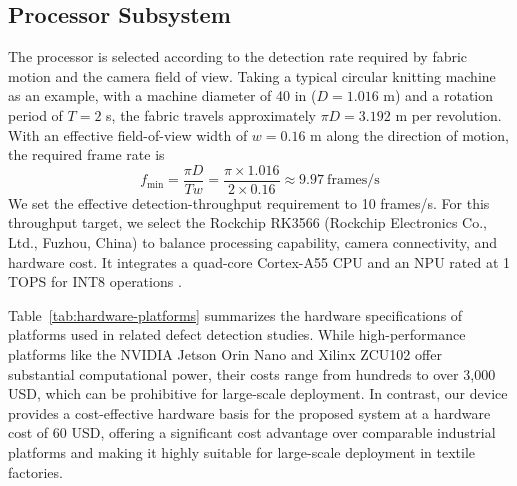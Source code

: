 \documentclass[journal]{IEEEtranTIE}
\begin{document}
\subsection{Processor Subsystem}
\label{sec:coverage}
The processor is selected according to the detection rate required by fabric motion and the camera field of view. Taking a typical circular knitting machine as an example, with a machine diameter of 40 in ($D=1.016$ m) and a rotation period of $T=2$ s, the fabric travels approximately $\pi D=3.192$ m per revolution. With an effective field-of-view width of $w=0.16$ m along the direction of motion, the required frame rate is
\begin{equation}
f_{\min}=\frac{\pi D}{Tw}
=\frac{\pi\times1.016}{2\times0.16}
\approx9.97\ \mathrm{frames/s}
\label{eq:coverage-rate}
\end{equation}
\noindent We set the effective detection-throughput requirement to 10 frames/s. For this throughput target, we select the Rockchip RK3566 (Rockchip Electronics Co., Ltd., Fuzhou, China) to balance processing capability, camera connectivity, and hardware cost. It integrates a quad-core Cortex-A55 CPU and an NPU rated at 1 TOPS for INT8 operations \cite{rockchiprk3566}.

Table~\ref{tab:hardware-platforms} summarizes the hardware specifications of platforms used in related defect detection studies. While high-performance platforms like the NVIDIA Jetson Orin Nano and Xilinx ZCU102 offer substantial computational power, their costs range from hundreds to over 3,000 USD, which can be prohibitive for large-scale deployment. In contrast, our device provides a cost-effective hardware basis for the proposed system at a hardware cost of 60 USD, offering a significant cost advantage over comparable industrial platforms and making it highly suitable for large-scale deployment in textile factories.
\end{document}
